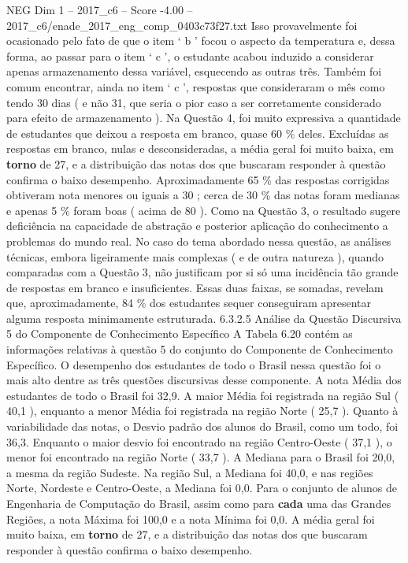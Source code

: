\begin{textsample}{NEG Dim 1 – 2017\_c6 – Score -4.00 – 2017\_c6/enade\_2017\_eng\_comp\_0403c73f27.txt}
Isso provavelmente foi ocasionado pelo fato de que o item ‘ b ’ focou o aspecto da temperatura e, dessa forma, ao passar para o item ‘ c ’, o estudante acabou induzido a considerar apenas armazenamento dessa variável, esquecendo as outras três.
Também foi comum encontrar, ainda no item ‘ c ’, respostas que consideraram o mês como tendo 30 dias ( e não 31, que seria o pior caso a ser corretamente considerado para efeito de armazenamento ).
Na Questão 4, foi muito expressiva a quantidade de estudantes que deixou a resposta em branco, quase 60 \% deles.
Excluídas as respostas em branco, nulas e desconsideradas, a média geral foi muito baixa, em \textbf{torno} de 27, e a distribuição das notas dos que buscaram responder à questão confirma o baixo desempenho.
Aproximadamente 65 \% das respostas corrigidas obtiveram nota menores ou iguais a 30 ; cerca de 30 \% das notas foram medianas e apenas 5 \% foram boas ( acima de 80 ).
Como na Questão 3, o resultado sugere deficiência na capacidade de abstração e posterior aplicação do conhecimento a problemas do mundo real.
No caso do tema abordado nessa questão, as análises técnicas, embora ligeiramente mais complexas ( e de outra natureza ), quando comparadas com a Questão 3, não justificam por si só uma incidência tão grande de respostas em branco e insuficientes.
Essas duas faixas, se somadas, revelam que, aproximadamente, 84 \% dos estudantes sequer conseguiram apresentar alguma resposta minimamente estruturada. 6.3.2.5 Análise da Questão Discursiva 5 do Componente de Conhecimento Específico A Tabela 6.20 contém as informações relativas à questão 5 do conjunto do Componente de Conhecimento Específico.
O desempenho dos estudantes de todo o Brasil nessa questão foi o mais alto dentre as três questões discursivas desse componente.
A nota Média dos estudantes de todo o Brasil foi 32,9.
A maior Média foi registrada na região Sul ( 40,1 ), enquanto a menor Média foi registrada na região Norte ( 25,7 ).
Quanto à variabilidade das notas, o Desvio padrão dos alunos do Brasil, como um todo, foi 36,3.
Enquanto o maior desvio foi encontrado na região Centro-Oeste ( 37,1 ), o menor foi encontrado na região Norte ( 33,7 ).
A Mediana para o Brasil foi 20,0, a mesma da região Sudeste.
Na região Sul, a Mediana foi 40,0, e nas regiões Norte, Nordeste e Centro-Oeste, a Mediana foi 0,0.
Para o conjunto de alunos de Engenharia de Computação do Brasil, assim como para \textbf{cada} uma das Grandes Regiões, a nota Máxima foi 100,0 e a nota Mínima foi 0,0.
A média geral foi muito baixa, em \textbf{torno} de 27, e a distribuição das notas dos que buscaram responder à questão confirma o baixo desempenho.

\end{textsample}
